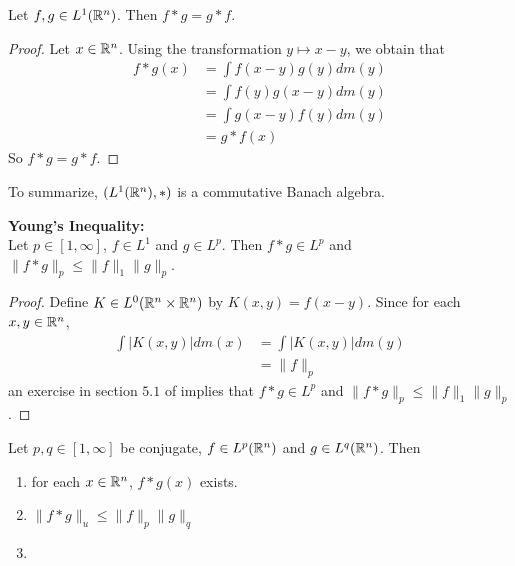 \documentclass{book}
\begin{document}
	\begin{ex}
	Let $f, g \in L^1(\mathbb{R}^n)$. Then $f * g = g* f$. 
	\end{ex}	
	
	\begin{proof}
	Let $x \in \mathbb{R}^n$. Using the transformation $y \mapsto x-y$, we obtain that 
	\begin{align*}
	f*g(x)
	&= \int f(x-y) g(y) dm(y) \\
	&= \int f(y) g(x-y) dm(y) \\
	&= \int g(x-y) f(y) dm(y) \\
	&= g *f(x)
	\end{align*}
	So $f * g = g* f$.
	\end{proof}
	
	\begin{note}
	To summarize, $(L^1(\mathbb{R}^n), *)$ is a commutative Banach algebra.
	\end{note}
	
	
	\begin{ex} \textbf{Young's Inequality:} \\
	 Let $p \in [1,\infty]$, $f \in L^1$ and $g \in L^p$. Then $f*g \in L^p$ and $\|f *g\|_p \leq \|f\|_1\|g\|_p$. 
	\end{ex}
	
	\begin{proof}
	Define $K \in L^0(\mathbb{R}^n \times \mathbb{R}^n)$ by $K(x,y) = f(x-y)$. Since for each $x,y \in \mathbb{R}^n$, 
	\begin{align*}
	\int|K(x,y)|dm(x) 
	&= \int|K(x,y)|dm(y) \\
	&= \|f\|_p
	\end{align*} 
	an exercise in section $5.1$ of 
	\cite{measure}
	implies that $f*g \in L^p$ and $\|f *g\|_p \leq \|f\|_1\|g\|_p$.
	\end{proof}
	
	\begin{ex}
	 Let $p, q \in [1, \infty]$ be conjugate, $f \in L^p(\mathbb{R}^n)$ and $g \in L^q(\mathbb{R}^n)$. Then 
	\begin{enumerate}
	\item for each $x \in \mathbb{R}^n$, $f * g(x)$ exists. 
	\item $\|f*g\|_u \leq \|f\|_p \|g\|_q $
	\item 
	\end{enumerate}
	\end{ex}
	
\end{document}
